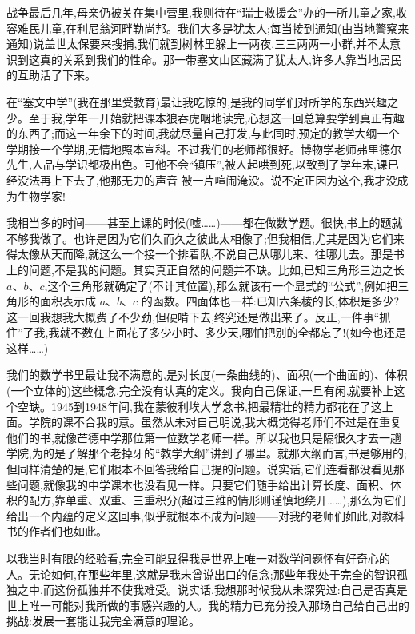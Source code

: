 战争最后几年,母亲仍被关在集中营里,我则待在“瑞士救援会”办的一所儿童之家,收容难民儿童,在利尼翁河畔勒尚邦。我们大多是犹太人;每当接到通知(由当地警察来通知)说盖世太保要来搜捕,我们就到树林里躲上一两夜,三三两两一小群,并不太意识到这真的关系到我们的性命。那一带塞文山区藏满了犹太人,许多人靠当地居民的互助活了下来。

在“塞文中学”(我在那里受教育)最让我吃惊的,是我的同学们对所学的东西兴趣之少。至于我,学年一开始就把课本狼吞虎咽地读完,心想这一回总算要学到真正有趣的东西了;而这一年余下的时间,我就尽量自己打发,与此同时,预定的教学大纲一个学期接一个学期,无情地照本宣科。不过我们的老师都很好。博物学老师弗里德尔先生,人品与学识都极出色。可他不会“镇压”,被人起哄到死,以致到了学年末,课已经没法再上下去了,他那无力的声音
被一片喧闹淹没。说不定正因为这个,我才没成为生物学家!

 我相当多的时间——甚至上课的时候(嘘……)——都在做数学题。很快,书上的题就不够我做了。也许是因为它们久而久之彼此太相像了;但我相信,尤其是因为它们来得太像从天而降,就这么一个接一个排着队,不说自己从哪儿来、往哪儿去。那是书上的问题,不是我的问题。其实真正自然的问题并不缺。比如,已知三角形三边之长 $a$、$b$、$c$,这个三角形就确定了(不计其位置),那么就该有一个显式的“公式”,例如把三角形的面积表示成 $a$、$b$、$c$ 的函数。四面体也一样:已知六条棱的长,体积是多少?这一回我想我大概费了不少劲,但硬啃下去,终究还是做出来了。反正,一件事“抓住”了我,我就不数在上面花了多少小时、多少天,哪怕把别的全都忘了!(如今也还是这样……)

我们的数学书里最让我不满意的,是对长度(一条曲线的)、面积(一个曲面的)、体积(一个立体的)这些概念,完全没有认真的定义。我向自己保证,一旦有闲,就要补上这个空缺。1945到1948年间,我在蒙彼利埃大学念书,把最精壮的精力都花在了这上面。学院的课不合我的意。虽然从未对自己明说,我大概觉得老师们不过是在重复他们的书,就像芒德中学那位第一位数学老师一样。所以我也只是隔很久才去一趟学院,为的是了解那个老掉牙的“教学大纲”讲到了哪里。就那大纲而言,书是够用的;但同样清楚的是,它们根本不回答我给自己提的问题。说实话,它们连看都没看见那些问题,就像我的中学课本也没看见一样。只要它们随手给出计算长度、面积、体积的配方,靠单重、双重、三重积分(超过三维的情形则谨慎地绕开……),那么为它们给出一个内蕴的定义这回事,似乎就根本不成为问题——对我的老师们如此,对教科书的作者们也如此。

 以我当时有限的经验看,完全可能显得我是世界上唯一对数学问题怀有好奇心的人。无论如何,在那些年里,这就是我未曾说出口的信念;那些年我处于完全的智识孤独之中,而这份孤独并不使我难受。说实话,我想那时候我从未深究过:自己是否真是世上唯一可能对我所做的事感兴趣的人。我的精力已充分投入那场自己给自己出的挑战:发展一套能让我完全满意的理论。

